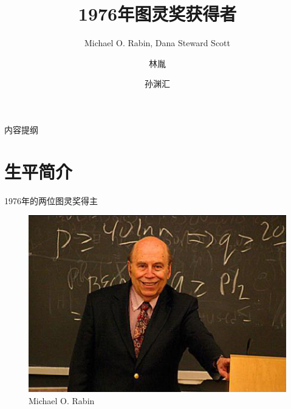 \documentclass{beamer}
\title[图灵奖获得者介绍] %
{1976年图灵奖获得者}
\subtitle
{Michael O. Rabin,  Dana Steward Scott}
\author[ly \and syh]%
{林胤\and 孙渊汇}
\institute
{
  同济大学电子与信息学院
}
\begin{document}
\begin{frame}
  \titlepage %
\end{frame}
\begin{frame}{内容提纲}
  \tableofcontents
\end{frame}

\section{生平简介}
\begin{frame}{1976年的两位图灵奖得主}
\pause
\begin{figure}[htbp]
	\begin{minipage}{0.4\textwidth}
	\centering
		\includegraphics[scale=0.3]{figures/lb2.eps}
		\caption*{Michael O. Rabin}
	\end{minipage}
	\pause
	\begin{minipage}{0.4\textwidth}
	\centering

\end{minipage}
\end{figure}
\end{frame}
\end{document}
